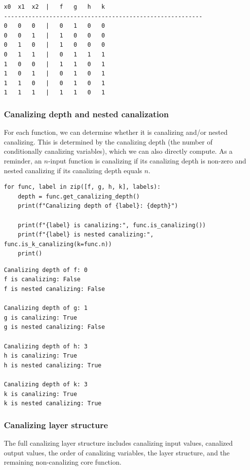 \documentclass[
]{article}
\begin{document}
\begin{lstlisting}
x0  x1  x2  |   f   g   h   k
---------------------------------------------------------
0   0   0   |   0   1   0   0
0   0   1   |   1   0   0   0
0   1   0   |   1   0   0   0
0   1   1   |   0   1   1   1
1   0   0   |   1   1   0   1
1   0   1   |   0   1   0   1
1   1   0   |   0   1   0   1
1   1   1   |   1   1   0   1
\end{lstlisting}

\subsubsection{Canalizing depth and nested
canalization}\label{canalizing-depth-and-nested-canalization}

For each function, we can determine whether it is canalizing and/or
nested canalizing. This is determined by the canalizing depth (the
number of conditionally canalizing variables), which we can also
directly compute. As a reminder, an \(n\)-input function is canalizing
if its canalizing depth is non-zero and nested canalizing if its
canalizing depth equals \(n\).

\begin{lstlisting}
for func, label in zip([f, g, h, k], labels):
    depth = func.get_canalizing_depth()
    print(f"Canalizing depth of {label}: {depth}")

    print(f"{label} is canalizing:", func.is_canalizing())
    print(f"{label} is nested canalizing:", func.is_k_canalizing(k=func.n))
    print()
\end{lstlisting}

\begin{lstlisting}
Canalizing depth of f: 0
f is canalizing: False
f is nested canalizing: False

Canalizing depth of g: 1
g is canalizing: True
g is nested canalizing: False

Canalizing depth of h: 3
h is canalizing: True
h is nested canalizing: True

Canalizing depth of k: 3
k is canalizing: True
k is nested canalizing: True
\end{lstlisting}

\subsubsection{Canalizing layer
structure}\label{canalizing-layer-structure}

The full canalizing layer structure includes canalizing input values,
canalized output values, the order of canalizing variables, the layer
structure, and the remaining non-canalizing core function.
\end{document}
